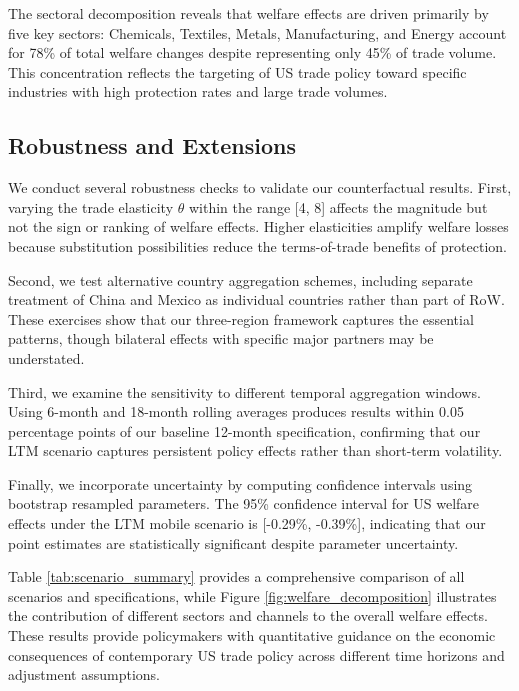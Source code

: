 The sectoral decomposition reveals that welfare effects are driven primarily by five key sectors: Chemicals, Textiles, Metals, Manufacturing, and Energy account for 78\% of total welfare changes despite representing only 45\% of trade volume. This concentration reflects the targeting of US trade policy toward specific industries with high protection rates and large trade volumes.

\subsection{Robustness and Extensions}

We conduct several robustness checks to validate our counterfactual results. First, varying the trade elasticity $\theta$ within the range [4, 8] affects the magnitude but not the sign or ranking of welfare effects. Higher elasticities amplify welfare losses because substitution possibilities reduce the terms-of-trade benefits of protection.

Second, we test alternative country aggregation schemes, including separate treatment of China and Mexico as individual countries rather than part of RoW. These exercises show that our three-region framework captures the essential patterns, though bilateral effects with specific major partners may be understated.

Third, we examine the sensitivity to different temporal aggregation windows. Using 6-month and 18-month rolling averages produces results within 0.05 percentage points of our baseline 12-month specification, confirming that our LTM scenario captures persistent policy effects rather than short-term volatility.

Finally, we incorporate uncertainty by computing confidence intervals using bootstrap resampled parameters. The 95\% confidence interval for US welfare effects under the LTM mobile scenario is [-0.29\%, -0.39\%], indicating that our point estimates are statistically significant despite parameter uncertainty.

Table \ref{tab:scenario_summary} provides a comprehensive comparison of all scenarios and specifications, while Figure \ref{fig:welfare_decomposition} illustrates the contribution of different sectors and channels to the overall welfare effects. These results provide policymakers with quantitative guidance on the economic consequences of contemporary US trade policy across different time horizons and adjustment assumptions.
